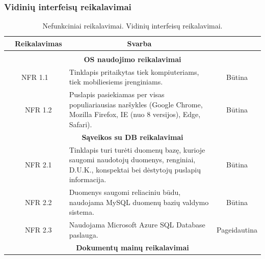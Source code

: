 \documentclass{VUMIFPSkursinis}
\begin{document}
\subsubsection{Vidinių interfeisų reikalavimai}
\begin{table}[H]
	\caption{Nefunkciniai reikalavimai. Vidinių interfeisų reikalavimai.}
	\begin{tabular}{|p{1cm}|p{1cm}|p{}|p{}|}
		\hline 
		\rowcolor{gray!50}
		\multicolumn{2}{|c|}{{\bfseries Kodas}}&
		\multicolumn{1}{c|}{{\bfseries Reikalavimas}}&
		\multicolumn{1}{c|}{{\bfseries Svarba}}\\
		\hline
		\rowcolor{lightgray}
		\multicolumn{4}{|c|}{Vidinių interfeisų reikalavimai}\\		
		
		\hline
		\multicolumn{4}{|c|}{\bfseries OS naudojimo reikalavimai}\\	
		
		\hline
		\multicolumn{2}{|c|}{NFR 1.1}&
		{Tinklapis pritaikytas tiek kompiuteriams, tiek mobiliesiems įrenginiams.
		}&		
		\multicolumn{1}{c|}{Būtina}\\
		\hline
		\multicolumn{1}{|c}{}&
		\multicolumn{1}{c|}{NFR 1.2}&
		{Puslapis pasiekiamas per visas populiariausias naršykles
			(Google Chrome, Mozilla Firefox, IE (nuo 8 versijos), Edge, Safari).
		}&		
		\multicolumn{1}{c|}{Būtina}\\
		
		\hline
		\multicolumn{4}{|c|}{\bfseries Sąveikos su DB reikalavimai}\\		
		
		\hline
		\multicolumn{1}{|c}{}&
		\multicolumn{1}{c|}{NFR 2.1}&
		{Tinklapis turi turėti duomenų bazę, kurioje saugomi naudotojų duomenys, renginiai, D.U.K., konspektai bei dėstytojų puslapių informacija.
		}&
		\multicolumn{1}{c|}{Būtina}\\	
		\hline		
		\multicolumn{1}{|c}{}&
		\multicolumn{1}{c|}{NFR 2.2}&
		{Duomenys saugomi reliaciniu būdu, naudojama MySQL
			duomenų bazių valdymo sistema.
		}&
		\multicolumn{1}{c|}{Būtina}\\		
		
		\hline		
		\multicolumn{1}{|c}{}&
		\multicolumn{1}{c|}{NFR 2.3}&
		{Naudojama Microsoft Azure SQL Database paslauga.
		}&
		\multicolumn{1}{c|}{Pageidautina}\\	
		
		
		\hline
		\multicolumn{4}{|c|}{\bfseries Dokumentų mainų reikalavimai}\\		
		

\end{tabular}
\end{table}
\end{document}
